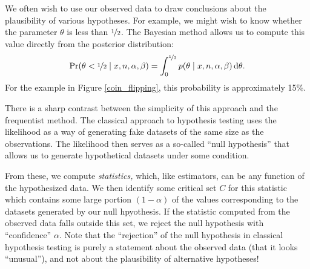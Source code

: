 \documentclass{article}
\newcommand{\given}{\mid}
\newcommand{\intd}[1]{\,\mathrm{d}{#1}}
\begin{document}
We often wish to use our observed data to draw conclusions about the
plausibility of various hypotheses.  For example, we might wish to
know whether the parameter $\theta$ is less than $\nicefrac{1}{2}$.
The Bayesian method allows us to compute this value directly from the
posterior distribution:
\begin{equation*}
  \Pr(\theta < \nicefrac{1}{2} \given x, n, \alpha, \beta)
  =
  \int_{0}^{\nicefrac{1}{2}} p(\theta \given x, n, \alpha, \beta) \intd{\theta}.
\end{equation*}
For the example in Figure \ref{coin_flipping}, this probability is
approximately 15\%.

There is a sharp contrast between the simplicity of this approach and
the frequentist method.  The classical approach to hypothesis testing
uses the likelihood as a way of generating fake datasets of the same
size as the observations.  The likelihood then serves as a so-called
``null hypothesis'' that allows us to generate hypothetical datasets
under some condition.

From these, we compute \emph{statistics,} which, like estimators, can
be any function of the hypothesized data.  We then identify some
critical set $C$ for this statistic which contains some large portion
$(1 - \alpha)$ of the values corresponding to the datasets generated
by our null hpyothesis.  If the statistic computed from the observed
data falls outside this set, we reject the null hypothesis with
``confidence'' $\alpha$.  Note that the ``rejection'' of the null
hypothesis in classical hypothesis testing is purely a statement about
the observed data (that it looks ``unusual''), and not about the
plausibility of alternative hypotheses!
\end{document}
